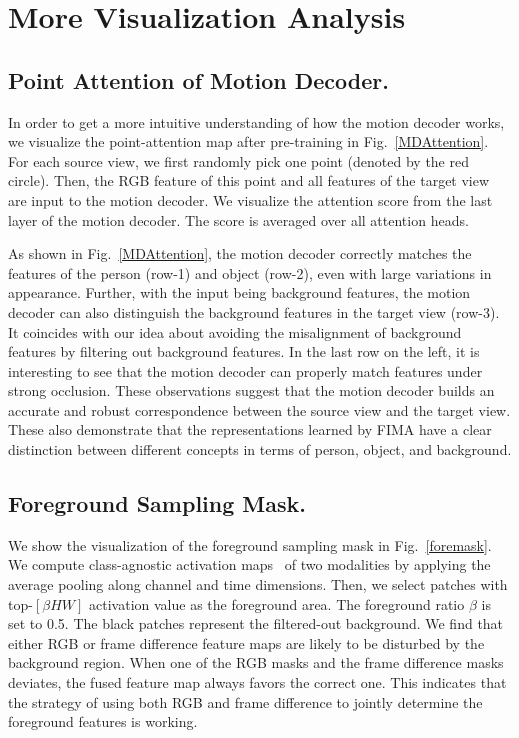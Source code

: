 \documentclass[sigconf,screen]{acmart}
\begin{document}
\section{More Visualization Analysis}

\subsection{Point Attention of Motion Decoder.}
In order to get a more intuitive understanding of how the motion decoder works, we visualize the point-attention map after pre-training in Fig.~\ref{MDAttention}. For each source view, we first randomly pick one point (denoted by the red circle). Then, the RGB feature of this point and all features of the target view are input to the motion decoder. We visualize the attention score from the last layer of the motion decoder. The score is averaged over all attention heads.

As shown in Fig.~\ref{MDAttention}, the motion decoder correctly matches the features of the person (row-1) and object (row-2), even with large variations in appearance. Further, with the input being background features, the motion decoder can also distinguish the background features in the target view (row-3). It coincides with our idea about avoiding the misalignment of background features by filtering out background features. In the last row on the left, it is interesting to see that the motion decoder can properly match features under strong occlusion. These observations suggest that the motion decoder builds an accurate and robust correspondence between the source view and the target view. These also demonstrate that the representations learned by FIMA have a clear distinction between different concepts in terms of person, object, and background.

\subsection{Foreground Sampling Mask.} 
We show the visualization of the foreground sampling mask in Fig.~\ref{foremask}. We compute class-agnostic activation maps~\cite{CAAM} of two modalities by applying the average pooling along channel and time dimensions. Then, we select patches with top-$[\beta H W]$ activation value as the foreground area. The foreground ratio $\beta$ is set to 0.5. The black patches represent the filtered-out background. We find that either RGB or frame difference feature maps are likely to be disturbed by the background region. When one of the RGB masks and the frame difference masks deviates, the fused feature map always favors the correct one. This indicates that the strategy of using both RGB and frame difference to jointly determine the foreground features is working.
\end{document}
